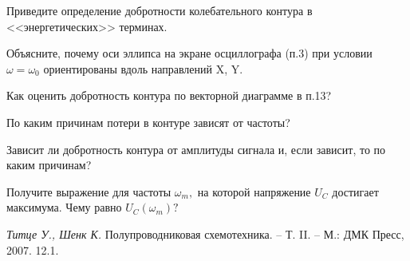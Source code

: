 \begin{lab:questions}
	\item Приведите определение добротности колебательного контура в <<энергетических>> терминах.
	
	\item Объясните, почему оси эллипса на экране осциллографа (п.3) при условии $\omega=\omega_0$ ориентированы вдоль направлений X, Y.
	
	\item Как оценить добротность контура по векторной диаграмме в п.13?
	
	\item По каким причинам потери в контуре зависят от частоты?
	
	\item Зависит ли добротность контура от амплитуды сигнала и, если зависит, то по каким причинам?
	
	\item Получите выражение для частоты $\omega_m,$ на которой напряжение $U_C$ достигает максимума. Чему равно $U_C(\omega_m)?$
\end{lab:questions}


\begin{lab:literature}
	\item \emph{Титце У., Шенк К.} Полупроводниковая схемотехника.  – Т. II. – М.: ДМК Пресс, 2007. 12.1.
\end{lab:literature}
